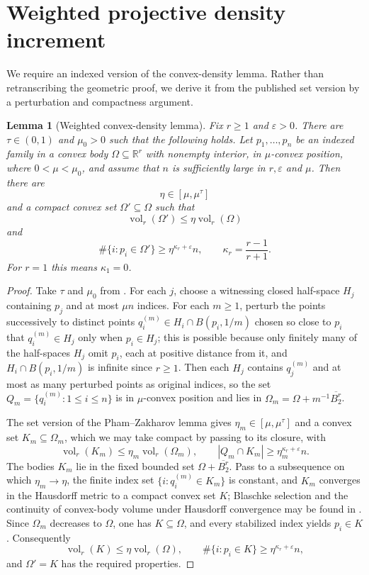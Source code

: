 \documentclass[11pt,reqno]{amsart}
\newtheorem{lemma}[theorem]{Lemma}
\theoremstyle{definition}
\theoremstyle{remark}
\newcommand{\R}{\mathbb R}
\newcommand{\eps}{\varepsilon}
\newcommand{\vol}{\operatorname{vol}}
\begin{document}
\section{Weighted projective density increment}
\label{sec:density-increment}

We require an indexed version of the convex-density lemma.  Rather than retranscribing the geometric proof, we derive it from the published set version by a perturbation and compactness argument.

\begin{lemma}[Weighted convex-density lemma]
\label{lem:weighted-density}
Fix $r\ge1$ and $\eps>0$.  There are $\tau\in(0,1)$ and $\mu_0>0$
such that the following holds.  Let $p_1,\dots,p_n$ be an indexed family in
a convex body $\Omega\subseteq\R^r$ with nonempty interior, in
$\mu$-convex position, where $0<\mu<\mu_0$, and assume that $n$ is
sufficiently large in $r,\eps$ and $\mu$.  Then there are
\[
 \eta\in[\mu,\mu^\tau]
\]
and a compact convex set $\Omega'\subseteq\Omega$ such that
\[
 \vol_r(\Omega')\le\eta\vol_r(\Omega)
\]
and
\[
 \#\{i:p_i\in\Omega'\}
 \ge\eta^{\kappa_r+\eps}n,
 \qquad
 \kappa_r=\frac{r-1}{r+1}.
\]
For $r=1$ this means $\kappa_1=0$.
\end{lemma}

\begin{proof}
Take $\tau$ and $\mu_0$ from \cite[Lemma~1]{PhamZakharov}.  For each $j$,
choose a witnessing closed half-space $H_j$ containing $p_j$ and at most
$\mu n$ indices.  For each $m\ge1$, perturb the points successively to
distinct points $q_i^{(m)}\in H_i\cap B(p_i,1/m)$ chosen so close to
$p_i$ that $q_i^{(m)}\in H_j$ only when $p_i\in H_j$; this is possible
because only finitely many of the half-spaces $H_j$ omit $p_i$, each at
positive distance from it, and $H_i\cap B(p_i,1/m)$ is infinite since
$r\ge1$.  Then each $H_j$ contains $q_j^{(m)}$ and at most as many
perturbed points as original indices, so the set
$Q_m=\{q_i^{(m)}:1\le i\le n\}$ is in $\mu$-convex position and lies in
$\Omega_m=\Omega+m^{-1}\overline{B_2^r}$.

The set version of the Pham--Zakharov lemma gives
$\eta_m\in[\mu,\mu^\tau]$ and a convex set $K_m\subseteq\Omega_m$, which
we may take compact by passing to its closure, with
\[
 \vol_r(K_m)\le\eta_m\vol_r(\Omega_m),
 \qquad
 |Q_m\cap K_m|\ge\eta_m^{\kappa_r+\eps}n.
\]
The bodies $K_m$ lie in the fixed bounded set
$\Omega+\overline{B_2^r}$.  Pass to a subsequence on which
$\eta_m\to\eta$, the finite index set $\{i:q_i^{(m)}\in K_m\}$ is
constant, and $K_m$ converges in the Hausdorff metric to a compact convex
set $K$; Blaschke selection and the continuity of convex-body volume
under Hausdorff convergence may be found in \cite{Schneider}.  Since
$\Omega_m$ decreases to $\Omega$, one has $K\subseteq\Omega$, and every
stabilized index yields $p_i\in K$.  Consequently
\[
 \vol_r(K)\le\eta\vol_r(\Omega),
 \qquad
 \#\{i:p_i\in K\}\ge\eta^{\kappa_r+\eps}n,
\]
and $\Omega'=K$ has the required properties.
\end{proof}
\end{document}
